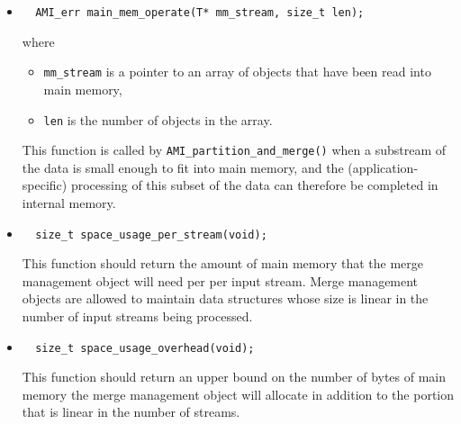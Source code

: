 \begin{itemize}
    \item {}
\begin{lstlisting}
  AMI_err main_mem_operate(T* mm_stream, size_t len);
\end{lstlisting}
\noindent
where
    \begin{itemize}
    \item \lstinline|mm_stream| is a pointer to an array of objects
      that have been read into main memory,
    \item \lstinline|len| is the number of objects in the array.
    \end{itemize}
    
    This function is called by \lstinline|AMI_partition_and_merge()|
    when a substream of the data is small enough to fit into main
    memory, and the (application-specific) processing of this subset
    of the data can therefore be completed in internal memory.

    
  \item {}
\begin{lstlisting}
  size_t space_usage_per_stream(void);
\end{lstlisting}
This function should return the amount of main memory that the merge
management object will need per per input stream. Merge management
objects are allowed to maintain data structures whose size is linear
in the number of input streams being processed.

\item {}
\begin{lstlisting}
  size_t space_usage_overhead(void);
\end{lstlisting}
This function should return an upper bound on the number of bytes of
main memory the merge management object will allocate in addition to
the portion that is linear in the number of streams.
    
\end{itemize}


\clearpage
 
 

